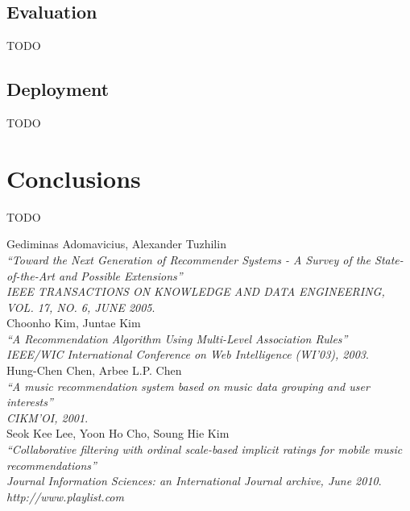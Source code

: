\documentclass[paper=a4, fontsize=11pt]{scrartcl} %
\numberwithin{equation}{section} %
\numberwithin{figure}{section} %
\numberwithin{table}{section} %
\begin{document}
\subsection{Evaluation}
TODO\\

\subsection{Deployment}
TODO\\

\section{Conclusions}
TODO\\

\newpage

\begin{thebibliography}{9}

 Gediminas Adomavicius, Alexander Tuzhilin\\
 \emph{``Toward the Next Generation of Recommender Systems - A Survey of the State-of-the-Art and Possible Extensions''}\\
 \emph{IEEE TRANSACTIONS ON KNOWLEDGE AND DATA ENGINEERING, VOL. 17, NO. 6, JUNE 2005}.\\

 Choonho Kim, Juntae Kim\\
 \emph{``A Recommendation Algorithm Using Multi-Level Association Rules''}\\
 \emph{IEEE/WIC International Conference on Web Intelligence (WI'03), 2003}.\\
    
 Hung-Chen Chen, Arbee L.P. Chen\\
 \emph{``A music recommendation system based on music data grouping and user interests''}\\
 \emph{CIKM'OI, 2001}.\\
   
 Seok Kee Lee, Yoon Ho Cho, Soung Hie Kim\\
 \emph{``Collaborative filtering with ordinal scale-based implicit ratings for mobile music recommendations''}\\
 \emph{Journal Information Sciences: an International Journal archive, June 2010}.\\

 \emph{http://www.playlist.com}\\

\end{thebibliography}
\end{document}
